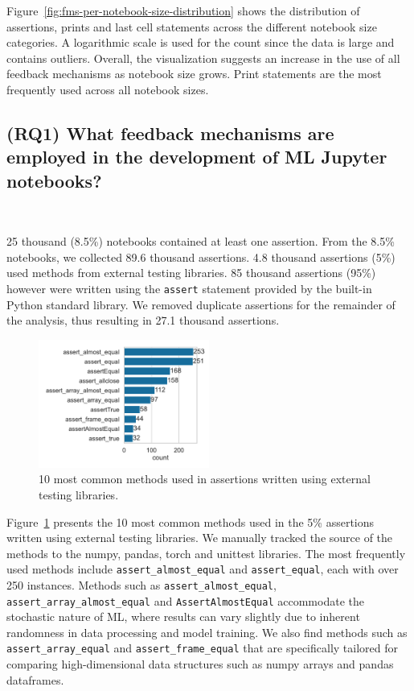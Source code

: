 \documentclass[smallextended]{svjour3}       %
\begin{document}
Figure~\ref{fig:fms-per-notebook-size-distribution} shows the distribution of assertions, prints and last cell statements across the different notebook size categories. A logarithmic scale is used for the count since the data is large and contains outliers. Overall, the visualization suggests an increase in the use of all feedback mechanisms as notebook size grows. Print statements are the most frequently used across all notebook sizes.

\subsection{(RQ1) What feedback mechanisms are employed in the development of ML Jupyter notebooks?}~\label{sec:result-analysis}

25 thousand (8.5\%) notebooks contained at least one assertion. From the 8.5\% notebooks, we collected 89.6 thousand assertions. 4.8 thousand assertions (5\%) used methods from external testing libraries. 85 thousand assertions (95\%) however were written using the \lstinline{assert} statement provided by the built-in Python standard library. We removed duplicate assertions for the remainder of the analysis, thus resulting in 27.1 thousand assertions.

\begin{figure}
	\centering
	\includegraphics[width=0.5\textwidth]{other-test-methods.pdf}
	\caption{10 most common methods used in assertions written using external testing libraries.}
	\label{fig:other-test-methods}
\end{figure}

Figure~\ref{fig:other-test-methods} presents the 10 most common methods used in the 5\% assertions written using external testing libraries. We manually tracked the source of the methods to the numpy, pandas, torch and unittest libraries. The most frequently used methods include \lstinline{assert_almost_equal} and \lstinline{assert_equal}, each with over 250 instances. Methods such as \lstinline{assert_almost_equal}, \lstinline{assert_array_almost_equal} and \lstinline{AssertAlmostEqual} accommodate the stochastic nature of ML, where results can vary slightly due to inherent randomness in data processing and model training. We also find methods such as \lstinline{assert_array_equal} and \lstinline{assert_frame_equal} that are specifically tailored for comparing high-dimensional data structures such as numpy arrays and pandas dataframes.
\end{document}
